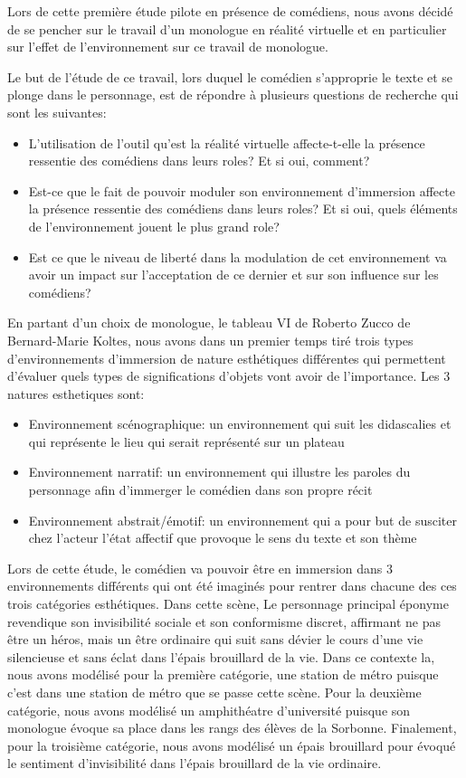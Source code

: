 Lors de cette première étude pilote en présence de comédiens, 
nous avons décidé de se pencher sur le travail d'un monologue en
réalité virtuelle et en particulier sur l'effet de l'environnement 
sur ce travail de monologue. 

Le but de l'étude de ce travail, lors duquel le comédien s'approprie le texte et se plonge dans 
le personnage, est de répondre à plusieurs questions de recherche qui sont les suivantes: 

\begin{itemize}
    \item L'utilisation de l'outil qu'est la réalité virtuelle affecte-t-elle la présence ressentie des comédiens dans leurs roles? Et si oui, comment?
    \item Est-ce que le fait de pouvoir moduler son environnement d'immersion affecte la présence ressentie des comédiens dans leurs roles? Et si oui, quels éléments de l'environnement jouent le plus grand role?
    \item Est ce que le niveau de liberté dans la modulation de cet environnement va avoir un impact sur l'acceptation de ce dernier et sur son influence sur les comédiens? 
\end{itemize}

En partant d'un choix de monologue, le tableau VI de Roberto Zucco de Bernard-Marie
Koltes, nous avons dans un premier temps tiré trois types d'environnements d'immersion 
de nature esthétiques différentes qui permettent d'évaluer quels types de significations 
d'objets vont avoir de l'importance. Les 3 natures esthetiques sont: 
\begin{itemize}
    \item Environnement scénographique: un environnement qui suit les didascalies et qui représente le lieu qui serait représenté sur un plateau
    \item Environnement narratif: un environnement qui illustre les paroles du personnage afin d'immerger le comédien dans son propre récit
    \item Environnement abstrait/émotif: un environnement qui a pour but de susciter chez l'acteur l'état affectif que provoque le sens du texte et son thème 
\end{itemize}

Lors de cette étude, le comédien va pouvoir être en immersion dans 3 environnements différents qui ont été imaginés pour rentrer
dans chacune des ces trois catégories esthétiques. Dans cette scène, Le personnage principal éponyme revendique son invisibilité 
sociale et son conformisme discret, affirmant ne pas être un héros, mais un être ordinaire qui suit sans dévier le cours d'une vie
silencieuse et sans éclat dans l'épais brouillard de la vie. Dans ce contexte la, nous avons modélisé pour la première catégorie, une 
station de métro puisque c'est dans une station de métro que se passe cette scène. Pour la deuxième catégorie, nous avons modélisé un
amphithéatre d'université puisque son monologue évoque sa place dans les rangs des élèves de la Sorbonne. Finalement, pour la troisième 
catégorie, nous avons modélisé un épais brouillard pour évoqué le sentiment d'invisibilité dans l'épais brouillard de la vie ordinaire. 